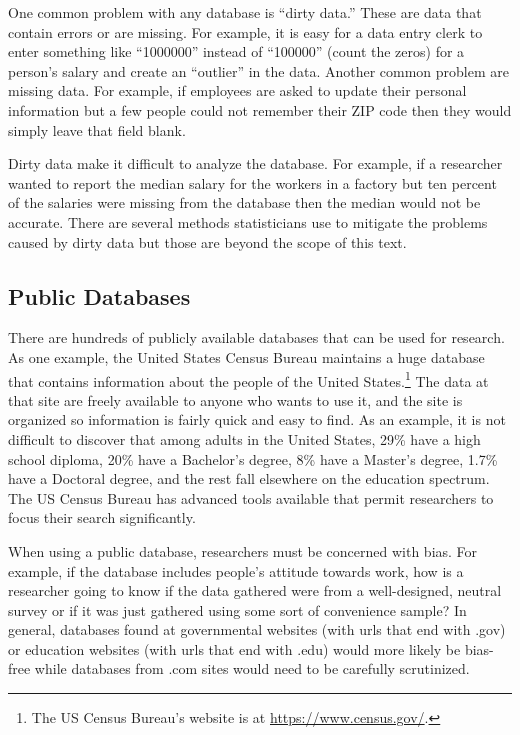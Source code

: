 One common problem with any database is ``dirty data.'' These are data that contain errors or are missing. For example, it is easy for a data entry clerk to enter something like ``1000000'' instead of ``100000'' (count the zeros) for a person's salary and create an ``outlier'' in the data. Another common problem are missing data. For example, if employees are asked to update their personal information but a few people could not remember their ZIP code then they would simply leave that field blank.

Dirty data make it difficult to analyze the database. For example, if a researcher wanted to report the median salary for the workers in a factory but ten percent of the salaries were missing from the database then the median would not be accurate. There are several methods statisticians use to mitigate the problems caused by dirty data but those are beyond the scope of this text. 

\subsection{Public Databases}

There are hundreds of publicly available databases that can be used for research. As one example, the United States Census Bureau maintains a huge database that contains information about the people of the United States.\footnote{The US Census Bureau's website is at \url{https://www.census.gov/}.} The data at that site are freely available to anyone who wants to use it, and the site is organized so information is fairly quick and easy to find. As an example, it is not difficult to discover that among adults in the United States, 29\% have a high school diploma, 20\% have a Bachelor's degree, 8\% have a Master's degree, 1.7\% have a Doctoral degree, and the rest fall elsewhere on the education spectrum. The US Census Bureau has advanced tools available that permit researchers to focus their search significantly.

When using a public database, researchers must be concerned with bias. For example, if the database includes people's attitude towards work, how is a researcher going to know if the data gathered were from a well-designed, neutral survey or if it was just gathered using some sort of convenience sample? In general, databases found at governmental websites (with urls that end with .gov) or education websites (with urls that end with .edu) would more likely be bias-free while databases from .com sites would need to be carefully scrutinized.

